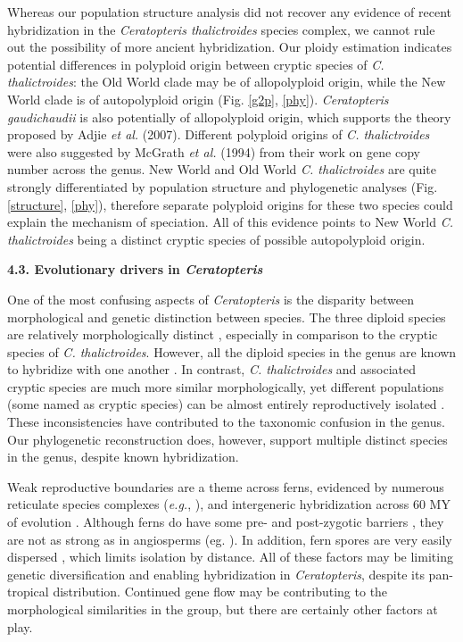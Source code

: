 \documentclass[12pt]{article}
\begin{document}
\begin{flushleft}
Whereas our population structure analysis did not recover any evidence of recent hybridization in the \textit{Ceratopteris thalictroides} species complex, we cannot rule out the possibility of more ancient hybridization. Our ploidy estimation indicates potential differences in polyploid origin between cryptic species of \textit{C. thalictroides}: the Old World clade may be of allopolyploid origin, while the New World clade is of autopolyploid origin (Fig. \ref{g2p}, \ref{phy}). \textit{Ceratopteris gaudichaudii} is also potentially of allopolyploid origin, which supports the theory proposed by Adjie \textit{et al.} (2007). Different polyploid origins of \textit{C. thalictroides} were also suggested by McGrath \textit{et al.} (1994)\nocite{McGrath1994} from their work on gene copy number across the genus. New World and Old World \textit{C. thalictroides} are quite strongly differentiated by population structure and phylogenetic analyses (Fig. \ref{structure}, \ref{phy}), therefore separate polyploid origins for these two species could explain the mechanism of speciation. All of this evidence points to New World \textit{C. thalictroides} being a distinct cryptic species of possible autopolyploid origin.

{\textbf{4.3. Evolutionary drivers in \textit{Ceratopteris}}}

One of the most confusing aspects of \textit{Ceratopteris} is the disparity between morphological and genetic distinction between species. The three diploid species are relatively morphologically distinct \autocite{LloydTax1974}, especially in comparison to the cryptic species of \textit{C. thalictroides}. However, all the diploid species in the genus are known to hybridize with one another \autocite{hickok1974, Hickok1977, LloydTax1974}. In contrast, \textit{C. thalictroides} and associated cryptic species are much more similar morphologically, yet different populations (some named as cryptic species) can be almost entirely reproductively isolated \autocite{Hickok1979, Masuyama2010}. These inconsistencies have contributed to the taxonomic confusion in the genus. Our phylogenetic reconstruction does, however, support multiple distinct species in the genus, despite known hybridization.

Weak reproductive boundaries are a theme across ferns, evidenced by numerous reticulate species complexes (\emph{e.g.}, \cite{Barrington1989,  Paris1989, Sessa2012a}), and intergeneric hybridization across 60 MY of evolution \autocite{Rothfels2015}. Although ferns do have some pre- and post-zygotic barriers \autocite{Haufler2016}, they are not as strong as in angiosperms (eg. \cite{De_Nettancourt1997, Lafon-Placette2016}). In addition, fern spores are very easily dispersed \autocite{Tryon1970, Smith1972}, which limits isolation by distance. All of these factors may be limiting genetic diversification and enabling hybridization in \textit{Ceratopteris}, despite its pan-tropical distribution. Continued gene flow may be contributing to the morphological similarities in the group, but there are certainly other factors at play.


\end{flushleft}
\end{document}
